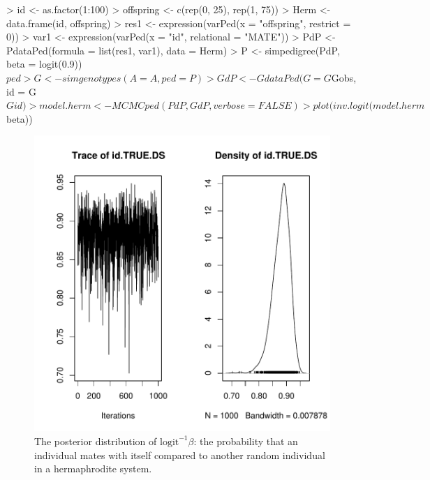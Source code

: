\documentclass{article}
\begin{document}
\begin{Schunk}
\begin{Sinput}
> id <- as.factor(1:100)
> offspring <- c(rep(0, 25), rep(1, 75))
> Herm <- data.frame(id, offspring)
> res1 <- expression(varPed(x = "offspring", restrict = 0))
> var1 <- expression(varPed(x = "id", relational = "MATE"))
> PdP <- PdataPed(formula = list(res1, var1), data = Herm)
> P <- simpedigree(PdP, beta = logit(0.9))$ped
> G <- simgenotypes(A = A, ped = P)
> GdP <- GdataPed(G = G$Gobs, id = G$Gid)
> model.herm <- MCMCped(PdP, GdP, verbose = FALSE)
> plot(inv.logit(model.herm$beta))
\end{Sinput}
\end{Schunk}


\begin{figure}[!h]
\begin{center}
\includegraphics{Tutorial-098}
\end{center}
\caption{The posterior distribution of $\textrm{logit}^{-1}\beta$: the probability that an individual mates with itself compared to another random individual in a hermaphrodite system.}
\label{Herm-fig}
\end{figure}
\end{document}
